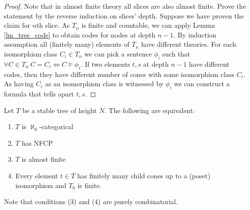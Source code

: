 \documentclass{amsart}
\begin{document}
\begin{proof}
	Note that in almost finite theory all slices are also almost finite. Prove the statement by the reverse induction on slices' depth. Suppose we have proven the claim for $n$th slice. As $T_n$ is finite and countable, we can apply Lemma \ref{lm_tree_code} to obtain codes for nodes at depth $n-1$. By induction assumption all (finitely many) elements of $T_n$ have different theories. For each isomorphism class $C_i \in T_n$ we can pick a sentence $\phi_i$ such that $\forall C \in T_n \  C = C_i \iff C \models \phi_i$. If two elements $t,s$ at depth $n-1$ have different codes, then they have different number of cones with some isomorphism class $C_i$. As having $C_i$ as an isomorphism class is witnessed by $\phi_i$ we can construct a formula that tells apart $t,s$.
\end{proof}

\begin{Theorem} \label{th_tree_nfcp}
	Let $T$ be a stable tree of height $N$. The following are equivalent:
	\begin{enumerate}
		\item $T$ is $\aleph_0$-categorical
		\item $T$ has NFCP
		\item $T$ is almost finite
		\item Every element $t \in T$ has finitely many child cones up to a (poset) isomorphism and $T_0$ is finite.
	\end{enumerate}
\end{Theorem}

Note that conditions (3) and (4) are purely combinatorial.
\end{document}
